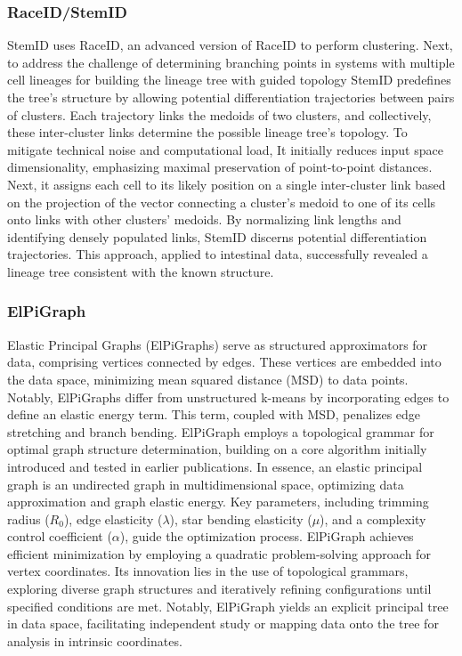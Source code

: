 \subsubsection{RaceID/StemID} StemID uses RaceID, an advanced version of RaceID to perform clustering. Next, to address the challenge of determining branching points in systems with multiple cell lineages for building the lineage tree with guided topology StemID predefines the tree's structure by allowing potential differentiation trajectories between pairs of clusters. Each trajectory links the medoids of two clusters, and collectively, these inter-cluster links determine the possible lineage tree's topology. To mitigate technical noise and computational load, It initially reduces input space dimensionality, emphasizing maximal preservation of point-to-point distances. Next, it assigns each cell to its likely position on a single inter-cluster link based on the projection of the vector connecting a cluster's medoid to one of its cells onto links with other clusters' medoids. By normalizing link lengths and identifying densely populated links, StemID discerns potential differentiation trajectories. This approach, applied to intestinal data, successfully revealed a lineage tree consistent with the known structure.
\subsubsection{ElPiGraph} Elastic Principal Graphs (ElPiGraphs) serve as structured approximators for data, comprising vertices connected by edges. These vertices are embedded into the data space, minimizing mean squared distance (MSD) to data points. Notably, ElPiGraphs differ from unstructured k-means by incorporating edges to define an elastic energy term. This term, coupled with MSD, penalizes edge stretching and branch bending. ElPiGraph employs a topological grammar for optimal graph structure determination, building on a core algorithm initially introduced and tested in earlier publications. In essence, an elastic principal graph is an undirected graph in multidimensional space, optimizing data approximation and graph elastic energy. Key parameters, including trimming radius ($R_0$), edge elasticity ($\lambda$), star bending elasticity ($\mu$), and a complexity control coefficient ($\alpha$), guide the optimization process. ElPiGraph achieves efficient minimization by employing a quadratic problem-solving approach for vertex coordinates. Its innovation lies in the use of topological grammars, exploring diverse graph structures and iteratively refining configurations until specified conditions are met. Notably, ElPiGraph yields an explicit principal tree in data space, facilitating independent study or mapping data onto the tree for analysis in intrinsic coordinates. 
